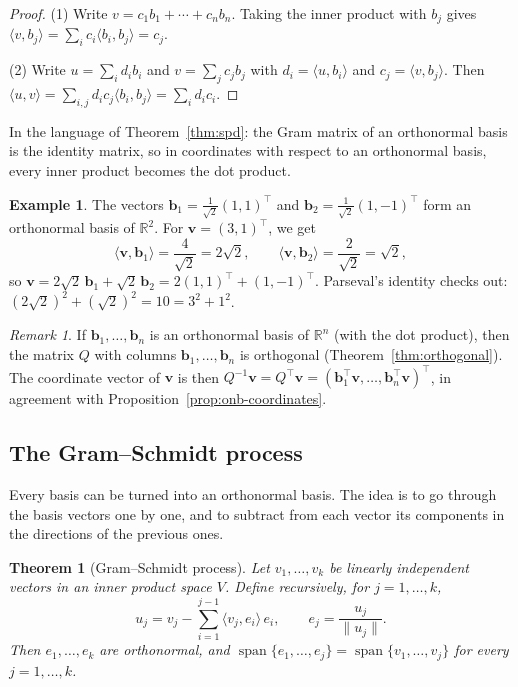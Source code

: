 \documentclass[11pt]{article}
\newcommand{\norm}[1]{\lVert #1 \rVert}
\newcommand{\ip}[2]{\langle #1, #2 \rangle}
\theoremstyle{definition}
\newtheorem{example}[definition]{Example}
\theoremstyle{plain}
\newtheorem{theorem}[definition]{Theorem}
\theoremstyle{remark}
\newtheorem{remark}[definition]{Remark}
\DeclareMathOperator{\Span}{span}
\begin{document}
\begin{proof}
    (1) Write $v = c_1 b_1 + \cdots + c_n b_n$. Taking the inner product with $b_j$ gives $\ip{v}{b_j} = \sum_i c_i \ip{b_i}{b_j} = c_j$.

    (2) Write $u = \sum_i d_i b_i$ and $v = \sum_j c_j b_j$ with $d_i = \ip{u}{b_i}$ and $c_j = \ip{v}{b_j}$. Then $\ip{u}{v} = \sum_{i, j} d_i c_j \ip{b_i}{b_j} = \sum_i d_i c_i$.
\end{proof}

In the language of Theorem~\ref{thm:spd}: the Gram matrix of an orthonormal basis is the identity matrix, so in coordinates with respect to an orthonormal basis, every inner product becomes the dot product.

\begin{example}\label{ex:onb-r2}
    The vectors $\mathbf{b}_1 = \frac{1}{\sqrt{2}}(1, 1)^\top$ and $\mathbf{b}_2 = \frac{1}{\sqrt{2}}(1, -1)^\top$ form an orthonormal basis of $\mathbb{R}^2$. For $\mathbf{v} = (3, 1)^\top$, we get
    \[\ip{\mathbf{v}}{\mathbf{b}_1} = \frac{4}{\sqrt{2}} = 2\sqrt{2}, \qquad \ip{\mathbf{v}}{\mathbf{b}_2} = \frac{2}{\sqrt{2}} = \sqrt{2},\]
    so $\mathbf{v} = 2\sqrt{2}\, \mathbf{b}_1 + \sqrt{2}\, \mathbf{b}_2 = 2(1, 1)^\top + (1, -1)^\top$. Parseval's identity checks out: $(2\sqrt{2})^2 + (\sqrt{2})^2 = 10 = 3^2 + 1^2$.
\end{example}

\begin{remark}
    If $\mathbf{b}_1, \ldots, \mathbf{b}_n$ is an orthonormal basis of $\mathbb{R}^n$ (with the dot product), then the matrix $Q$ with columns $\mathbf{b}_1, \ldots, \mathbf{b}_n$ is orthogonal (Theorem~\ref{thm:orthogonal}). The coordinate vector of $\mathbf{v}$ is then $Q^{-1} \mathbf{v} = Q^\top \mathbf{v} = (\mathbf{b}_1^\top \mathbf{v}, \ldots, \mathbf{b}_n^\top \mathbf{v})^\top$, in agreement with Proposition~\ref{prop:onb-coordinates}.
\end{remark}

\subsection{The Gram--Schmidt process}

Every basis can be turned into an orthonormal basis. The idea is to go through the basis vectors one by one, and to subtract from each vector its components in the directions of the previous ones.

\begin{theorem}[Gram--Schmidt process]\label{thm:gram-schmidt}
    Let $v_1, \ldots, v_k$ be linearly independent vectors in an inner product space $V$. Define recursively, for $j = 1, \ldots, k$,
    \[u_j = v_j - \sum_{i=1}^{j-1} \ip{v_j}{e_i}\, e_i, \qquad e_j = \frac{u_j}{\norm{u_j}}.\]
    Then $e_1, \ldots, e_k$ are orthonormal, and $\Span\{e_1, \ldots, e_j\} = \Span\{v_1, \ldots, v_j\}$ for every $j = 1, \ldots, k$.
\end{theorem}
\end{document}
